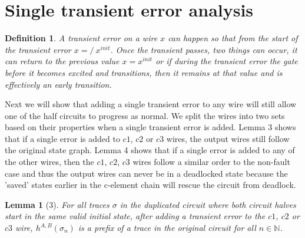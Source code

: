 \documentclass{article}
\newtheorem*{definition}{Definition}
\newtheorem*{lemma}{Lemma}
\begin{document}
\section{Single transient error analysis}
\begin{definition}A transient error on a wire $x$ can happen so that from the start of the transient error $x=/~x^{init}$.  Once the transient passes, two things can occur, it can return to the previous value $x=x^{init}$ or if during the transient error the gate before it becomes excited and transitions, then it remains at that value and is effectively an early transition. %
\end{definition}
Next we will show that adding a single transient error to any wire will still allow one of the half circuits to progress as normal.  We split the wires into two sets based on their properties when a single transient error is added.  Lemma 3 shows that if a single error is added to $c1$, $c2$ or $c3$ wires, the output wires still follow the original state graph.  Lemma 4 shows that if a single error is added to any of the other wires, then the $c1$, $c2$, $c3$ wires follow a similar order to the non-fault case and thus the output wires can never be in a deadlocked state because the 'saved' states earlier in the c-element chain will rescue the circuit from deadlock.
\begin{lemma}[3]
For all traces $\sigma$ in the duplicated circuit where both circuit halves start in the same valid initial state, after adding a transient error to the $c1$, $c2$ or $c3$ wire, $h^{A,B}(\sigma_n)$ is a prefix of a trace in the original circuit for all $n \in \mathbb{N}$.
\end{lemma}
\end{document}
